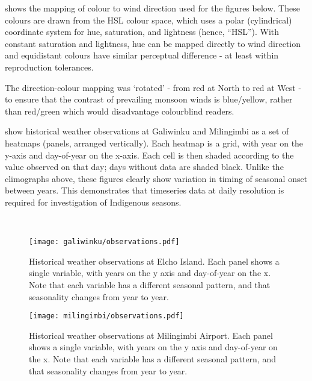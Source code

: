  shows the mapping of colour to wind direction used
for the figures below.  These colours are drawn from the HSL colour space,
which uses a polar (cylindrical) coordinate system for hue, saturation,
and lightness (hence, ``HSL'').  With constant saturation and lightness,
hue can be mapped directly to wind direction and equidistant colours
have similar perceptual difference - at least within reproduction tolerances.

The direction-colour mapping was `rotated' - from red at North to red at West -
to ensure that the contrast of prevailing monsoon winds is blue/yellow,
rather than red/green which would disadvantage colourblind readers.


show historical weather observations at Galiwinku and Milingimbi as a set of
heatmaps (panels, arranged vertically).  Each heatmap is a grid, with year
on the y-axis and day-of-year on the x-axis.  Each cell is then shaded
according to the value observed on that day; days without data are shaded
black.
%
Unlike the climographs above, these figures clearly show variation in timing
of seasonal onset between years.  This demonstrates that timeseries data
at daily resolution is required for investigation of Indigenous seasons.

~\\



\begin{figure}[p]
    \centering
    \texttt{[image: galiwinku/observations.pdf]}
    \caption[Historical weather observations at Elcho Island]{
        Historical weather observations at Elcho Island.
        Each panel shows a single variable, with years on the y axis and day-of-year on the x.
        Note that each variable has a different seasonal pattern,
        and that seasonality changes from year to year.}
    \label{fig:galiwinku-observations}
\end{figure}
\begin{figure}[p]
    \centering
    \texttt{[image: milingimbi/observations.pdf]}
    \caption[Historical weather observations at Milingimbi Airport]{
        Historical weather observations at Milingimbi Airport.
        Each panel shows a single variable, with years on the y axis and day-of-year on the x.
        Note that each variable has a different seasonal pattern,
        and that seasonality changes from year to year.}
    \label{fig:milingimbi-observations}
\end{figure}




